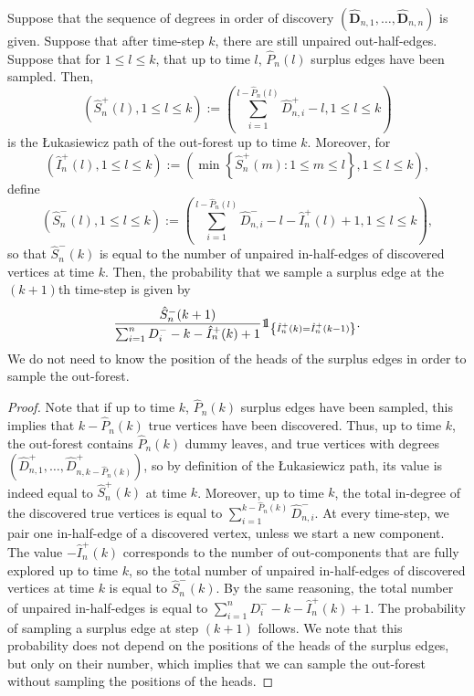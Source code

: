 \begin{proposition}\label{prop:sampleoutforest}
Suppose that the sequence of degrees in order of discovery $(\mathbf{\hat{D}}_{n,1},\dots,\mathbf{\hat{D}}_{n, n})$ is given. Suppose that after time-step $k$, there are still unpaired out-half-edges. Suppose that for $1\leq l\leq k$, that up to time $l$, $\hat{P}_n(l)$ surplus edges have been sampled. Then, $$\left(\hat{S}^+_n(l),1\leq l\leq k \right):=\left(\sum_{i=1}^{l-\hat{P}_n(l)}\hat{D}^+_{n,i}-l,1\leq l\leq k\right)$$ is the \L ukasiewicz path of the out-forest up to time $k$. Moreover, for $$\left(\hat{I}^+_n(l),1\leq l\leq k\right):=\left(\min\left\{\hat{S}^+_n(m):1\leq m \leq l\right\},1\leq l \leq k \right),$$
define 
$$\left(\hat{S}^-_n(l),1\leq l \leq k\right):=\left(\sum_{i=1}^{l-\hat{P}_n(l)}\hat{D}^-_{n,i}-l-\hat{I}^+_n(l)+1,1\leq l\leq k\right),$$
so that $\hat{S}^-_n(k)$ is equal to the number of unpaired in-half-edges of discovered vertices at time $k$. Then, the probability that we sample a surplus edge at the $(k+1)$th time-step is given by
$$\frac{\hat{S}^-_n(k+1)}{\sum_{i=1}^n D^-_i-k-\hat{I}^+_n(k)+1}\one_{\left\{\hat{I}^+_n(k)=\hat{I}^+_n(k-1)\right\}}.$$
We do not need to know the position of the heads of the surplus edges in order to sample the out-forest.
\end{proposition}
\begin{proof}
Note that if up to time $k$, $\hat{P}_n(k)$ surplus edges have been sampled, this implies that $k-\hat{P}_n(k)$ true vertices have been discovered. Thus, up to time $k$, the out-forest contains $\hat{P}_n(k)$ dummy leaves, and true vertices with degrees $(\hat{D}^+_{n,1},\dots,\hat{D}^+_{n,k-\hat{P}_n(k)})$, so by definition of the \L ukasiewicz path, its value is indeed equal to $\hat{S}^+_n(k)$ at time $k$. Moreover, up to time $k$, the total in-degree of the discovered true vertices is equal to $\sum_{i=1}^{k-\hat{P}_n(k)}\hat{D}^-_{n,i}$. At every time-step, we pair one in-half-edge of a discovered vertex, unless we start a new component. The value $-\hat{I}^+_n(k)$ corresponds to the number of out-components that are fully explored up to time $k$, so the total number of unpaired in-half-edges of discovered vertices at time $k$ is equal to $\hat{S}^-_n(k)$. By the same reasoning, the total number of unpaired in-half-edges is equal to $\sum_{i=1}^n D^-_i-k-\hat{I}^+_n(k)+1$. The probability of sampling a surplus edge at step $(k+1)$ follows. We note that this probability does not depend on the positions of the heads of the surplus edges, but only on their number, which implies that we can sample the out-forest without sampling the positions of the heads.
\end{proof}
